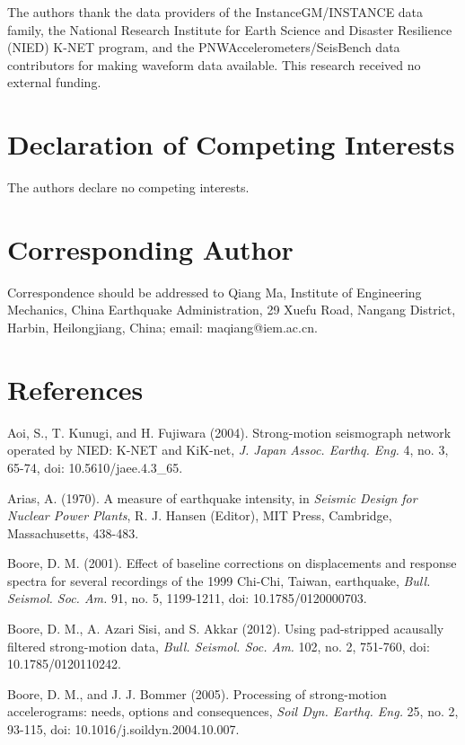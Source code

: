 \documentclass[12pt,letterpaper]{article}
\begin{document}
The authors thank the data providers of the InstanceGM/INSTANCE data family, the National Research Institute for Earth Science and Disaster Resilience (NIED) K-NET program, and the PNWAccelerometers/SeisBench data contributors for making waveform data available. This research received no external funding.

\section{Declaration of Competing Interests}\label{declaration-of-competing-interests}

The authors declare no competing interests.

\section{Corresponding Author}\label{corresponding-author}

Correspondence should be addressed to Qiang Ma, Institute of Engineering Mechanics, China Earthquake Administration, 29 Xuefu Road, Nangang District, Harbin, Heilongjiang, China; email: maqiang@iem.ac.cn.

\section{References}\label{references}

Aoi, S., T. Kunugi, and H. Fujiwara (2004). Strong-motion seismograph network operated by NIED: K-NET and KiK-net, \emph{J. Japan Assoc. Earthq. Eng.} 4, no. 3, 65-74, doi: 10.5610/jaee.4.3\_65.

Arias, A. (1970). A measure of earthquake intensity, in \emph{Seismic Design for Nuclear Power Plants}, R. J. Hansen (Editor), MIT Press, Cambridge, Massachusetts, 438-483.

Boore, D. M. (2001). Effect of baseline corrections on displacements and response spectra for several recordings of the 1999 Chi-Chi, Taiwan, earthquake, \emph{Bull. Seismol. Soc. Am.} 91, no. 5, 1199-1211, doi: 10.1785/0120000703.

Boore, D. M., A. Azari Sisi, and S. Akkar (2012). Using pad-stripped acausally filtered strong-motion data, \emph{Bull. Seismol. Soc. Am.} 102, no. 2, 751-760, doi: 10.1785/0120110242.

Boore, D. M., and J. J. Bommer (2005). Processing of strong-motion accelerograms: needs, options and consequences, \emph{Soil Dyn. Earthq. Eng.} 25, no. 2, 93-115, doi: 10.1016/j.soildyn.2004.10.007.
\end{document}
